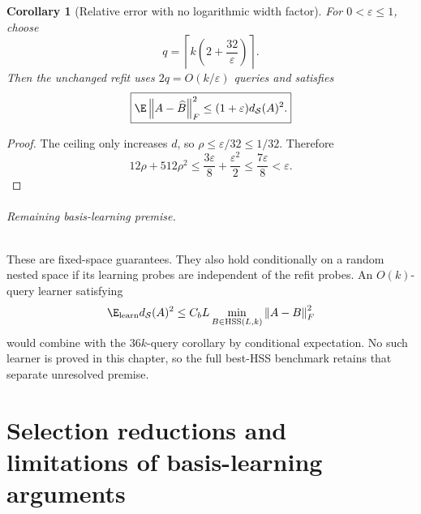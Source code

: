 \documentclass[11pt,oneside,openany,a4paper]{book}
\numberwithin{equation}{chapter}
\newtheorem{corollary}[theorem]{Corollary}
\theoremstyle{definition}
\theoremstyle{remark}
\newcommand{\F}[1]{\left\lVert#1\right\rVert_F}
\begin{document}
\begin{corollary}[Relative error with no logarithmic width factor]
For $0<\varepsilon\le1$, choose
\[
 \boxed{q=\left\lceil k\left(2+\frac{32}{\varepsilon}\right)\right\rceil.}
\]
Then the unchanged refit uses $2q=O(k/\varepsilon)$ queries and satisfies
\[
 \boxed{\E\F{A-\widehat B}^2\le(1+\varepsilon)d_{\mathcal S}(A)^2.}
\]
\end{corollary}
\begin{proof}
The ceiling only increases $d$, so $\rho\le\varepsilon/32\le1/32$.
Therefore
\[
 12\rho+512\rho^2
 \le\frac{3\varepsilon}{8}+\frac{\varepsilon^2}{2}
 \le\frac{7\varepsilon}{8}<\varepsilon.
\]
\end{proof}

\paragraph{Remaining basis-learning premise.}
These are fixed-space guarantees. They also hold conditionally on a
random nested space if its learning probes are independent of the refit
probes. An $O(k)$-query learner satisfying
\[
 \E_{\rm learn}d_{\mathcal S}(A)^2
 \le C_bL\min_{B\in{\rm HSS}(L,k)}\F{A-B}^2
\]
would combine with the $36k$-query corollary by conditional expectation.
No such learner is proved in this chapter, so the full best-HSS benchmark
retains that separate unresolved premise.

\endgroup

\part{Selection reductions and limitations of basis-learning arguments}
\end{document}
